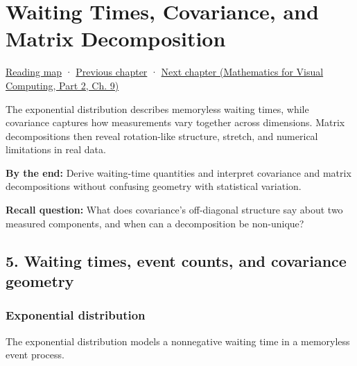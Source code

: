 \chapter{Waiting Times, Covariance, and Matrix Decomposition}\label{02-foundations-ii-ch024-waiting-times-covariance-and-matrix-decomposition}\hypertarget{02-foundations-ii-ch024}{}\label{stagechapter:02-foundations-ii-ch024}

\hypertarget{02-foundations-ii-ch024-waiting-times-covariance-and-matrix-decomposition}{}

\hyperref[volume-reading-map]{Reading map} · \hyperref[02-foundations-ii-ch023-probability-models-and-measurement-error]{Previous chapter} · \href{../02-Mathematics-for-Visual-Computing-P02/main.pdf\#nameddest=02-foundations-ii-ch025-continuous-models-and-numerical-error}{Next chapter (Mathematics for Visual Computing, Part 2, Ch. 9)}

The exponential distribution describes memoryless waiting times, while covariance captures how measurements vary together across dimensions. Matrix decompositions then reveal rotation-like structure, stretch, and numerical limitations in real data.

\textbf{By the end:} Derive waiting-time quantities and interpret covariance and matrix decompositions without confusing geometry with statistical variation.

\textbf{Recall question:} What does covariance's off-diagonal structure say about two measured components, and when can a decomposition be non-unique?

\section{5. Waiting times, event counts, and covariance geometry}\label{02-foundations-ii-ch024-waiting-times-event-counts-and-covariance-geometry}

\hypertarget{02-foundations-ii-ch024-waiting-times-event-counts-and-covariance-geometry}{}

\subsection{Exponential distribution}\label{02-foundations-ii-ch024-exponential-distribution}

\hypertarget{02-foundations-ii-ch024-exponential-distribution}{}

The exponential distribution models a nonnegative waiting time in a memoryless event process.

